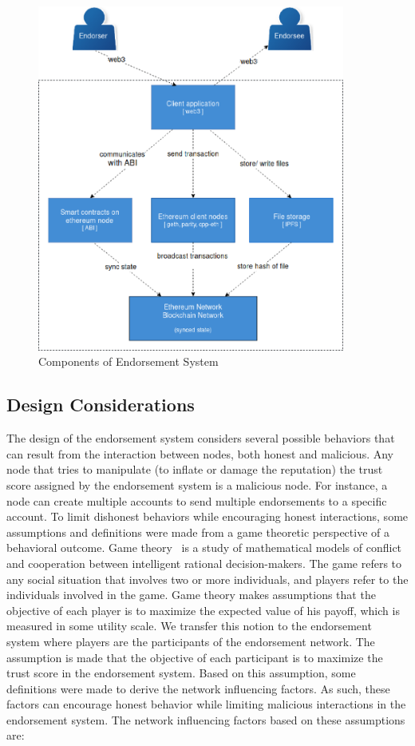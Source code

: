 \begin{figure}
	\includegraphics[width=0.9\textwidth]{Images/components.eps}
	\caption{Components of Endorsement System}
	\label{fig:components}
\end{figure}
\subsection{Design Considerations} \label{subsec:designconsiderations}
The design of the endorsement system considers several possible behaviors that
can result from the interaction between nodes, both honest and malicious. Any
node that tries to manipulate (to inflate or damage the reputation) the trust
score assigned by the endorsement system is a malicious node. For instance, a
node can create multiple accounts to send multiple endorsements to a specific
account. To limit dishonest behaviors while encouraging honest interactions,
some assumptions and definitions were made from a game theoretic perspective of
a behavioral outcome. Game theory~\cite{myerson2013game} is a study of
mathematical models of conflict and cooperation between intelligent rational
decision-makers. The game refers to any social situation that involves two or
more individuals, and players refer to the individuals involved in the game.
Game theory makes assumptions that the objective of each player is to maximize
the expected value of his payoff, which is measured in some utility scale.  We
transfer this notion to the endorsement system where players are the
participants of the endorsement network. The assumption is made that the
objective of each participant is to maximize the trust score in the endorsement
system. Based on this assumption, some definitions were made to derive the
network influencing factors. As such, these factors can encourage honest
behavior while limiting malicious interactions in the endorsement system.  The
network influencing factors based on these assumptions are:
